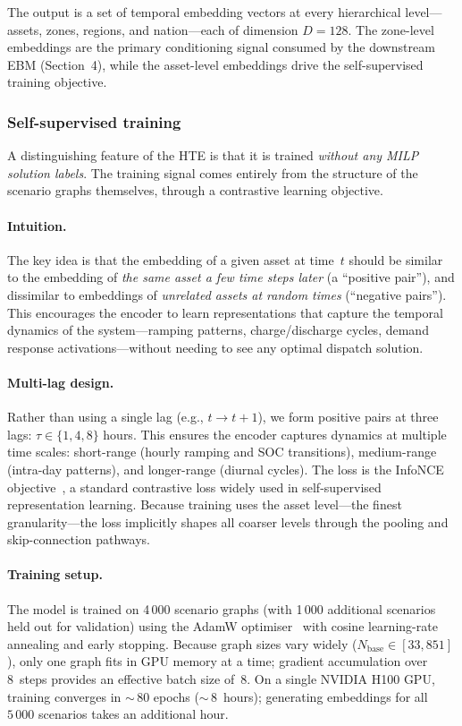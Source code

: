 \documentclass{article}
\begin{document}
The output is a set of temporal embedding vectors at every hierarchical level---assets, zones, regions, and nation---each of dimension $D = 128$. The zone-level embeddings are the primary conditioning signal consumed by the downstream EBM (Section~4), while the asset-level embeddings drive the self-supervised training objective.


\subsubsection{Self-supervised training}
\label{sec:hte_training}

A distinguishing feature of the HTE is that it is trained \emph{without any MILP solution labels}. The training signal comes entirely from the structure of the scenario graphs themselves, through a contrastive learning objective.

\paragraph{Intuition.}
The key idea is that the embedding of a given asset at time~$t$ should be similar to the embedding of \emph{the same asset a few time steps later} (a ``positive pair''), and dissimilar to embeddings of \emph{unrelated assets at random times} (``negative pairs''). This encourages the encoder to learn representations that capture the temporal dynamics of the system---ramping patterns, charge/discharge cycles, demand response activations---without needing to see any optimal dispatch solution.

\paragraph{Multi-lag design.}
Rather than using a single lag (e.g., $t \to t{+}1$), we form positive pairs at three lags: $\tau \in \{1, 4, 8\}$ hours. This ensures the encoder captures dynamics at multiple time scales: short-range (hourly ramping and SOC transitions), medium-range (intra-day patterns), and longer-range (diurnal cycles). The loss is the InfoNCE objective~\citep{oord2018representation}, a standard contrastive loss widely used in self-supervised representation learning. Because training uses the asset level---the finest granularity---the loss implicitly shapes all coarser levels through the pooling and skip-connection pathways.

\paragraph{Training setup.}
The model is trained on 4\,000 scenario graphs (with 1\,000 additional scenarios held out for validation) using the AdamW optimiser~\citep{loshchilov2019decoupled} with cosine learning-rate annealing and early stopping. Because graph sizes vary widely ($N_{\mathrm{base}} \in [33, 851]$), only one graph fits in GPU memory at a time; gradient accumulation over 8~steps provides an effective batch size of~8. On a single NVIDIA H100 GPU, training converges in ${\sim}\,80$ epochs (${\sim}\,8$~hours); generating embeddings for all $5\,000$ scenarios takes an additional hour.
\end{document}
